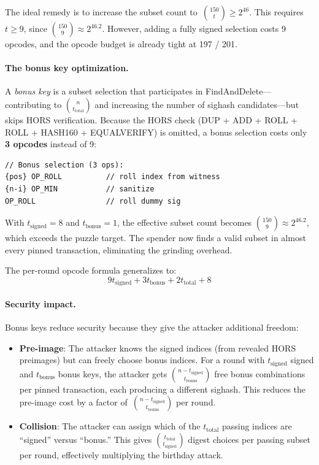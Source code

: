 \documentclass[11pt, a4paper]{article}
\begin{document}
The ideal remedy is to increase the subset count to~$\binom{150}{t} \geq 2^{46}$. This requires $t \geq 9$, since $\binom{150}{9} \approx 2^{46.2}$. However, adding a fully signed selection costs 9 opcodes, and the opcode budget is already tight at 197 / 201.

\paragraph{The bonus key optimization.}
A \emph{bonus key} is a subset selection that participates in FindAndDelete---contributing to $\binom{n}{t_{\mathrm{total}}}$ and increasing the number of sighash candidates---but skips HORS verification. Because the HORS check (DUP + ADD + ROLL + ROLL + HASH160 + EQUALVERIFY) is omitted, a bonus selection costs only \textbf{3 opcodes} instead of 9:

\begin{lstlisting}[language={}, numbers=none]
// Bonus selection (3 ops):
{pos} OP_ROLL          // roll index from witness
{n-i} OP_MIN           // sanitize
OP_ROLL                // roll dummy sig
\end{lstlisting}

\noindent With $t_{\mathrm{signed}} = 8$ and $t_{\mathrm{bonus}} = 1$, the effective subset count becomes $\binom{150}{9} \approx 2^{46.2}$, which exceeds the puzzle target. The spender now finds a valid subset in almost every pinned transaction, eliminating the grinding overhead.

The per-round opcode formula generalizes to:
$$9 t_{\mathrm{signed}} + 3 t_{\mathrm{bonus}} + 2 t_{\mathrm{total}} + 8$$

\paragraph{Security impact.}
Bonus keys reduce security because they give the attacker additional freedom:

\begin{itemize}
    \item \textbf{Pre-image}: The attacker knows the signed indices (from revealed HORS preimages) but can freely choose bonus indices. For a round with $t_{\mathrm{signed}}$ signed and $t_{\mathrm{bonus}}$ bonus keys, the attacker gets $\binom{n - t_{\mathrm{signed}}}{t_{\mathrm{bonus}}}$ free bonus combinations per pinned transaction, each producing a different sighash. This reduces the pre-image cost by a factor of~$\binom{n - t_{\mathrm{signed}}}{t_{\mathrm{bonus}}}$ per round.

    \item \textbf{Collision}: The attacker can assign which of the $t_{\mathrm{total}}$ passing indices are ``signed'' versus ``bonus.'' This gives $\binom{t_{\mathrm{total}}}{t_{\mathrm{signed}}}$ digest choices per passing subset per round, effectively multiplying the birthday attack.
\end{itemize}
\end{document}
